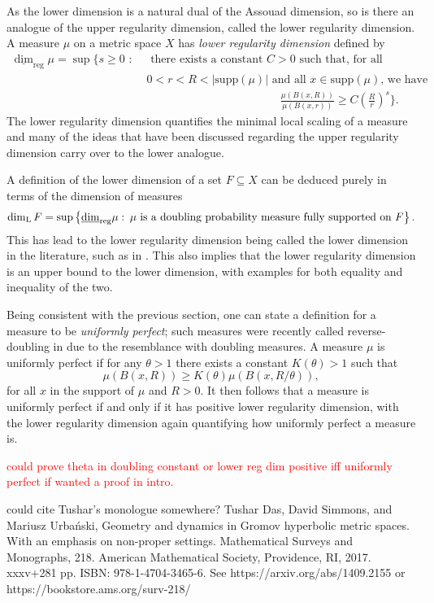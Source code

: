 As the lower dimension is a natural dual of the Assouad dimension, so is there an analogue of the upper regularity dimension, called the lower regularity dimension. A measure $\mu$ on a metric space $X$ has \textit{lower regularity dimension} defined by 
\begin{align*} 
\underline{\dim}_{\text{reg}} \mu = \sup \Bigg\{ s \geq 0 \, \,  : \,  &\,\text{ there exists a  constant }C  > 0\text{  such that, for all }  \\ & \, 0< r< R < \lvert \text{supp}(\mu)    \rvert \text{  and all $x \in \text{supp} (\mu)$, we have }  \\  & \hspace{5cm} \frac{\mu(B(x,R))}{\mu(B(x,r))} \geq C\left(\frac{R}{r}\right)^{s} \Bigg\}.
\end{align*}
The lower regularity dimension quantifies the minimal local scaling of a measure and many of the ideas that have been discussed regarding the upper regularity dimension carry over to the lower analogue. 

A definition of the lower dimension of a set $F\subseteq X$ can be deduced purely in terms of the dimension of measures
\begin{equation}
    \dim_{\text{L}} F = \sup \left\{ \underline{\dim}_{\textup{reg}} \mu \,  \colon \, \mu \text{ is a doubling probability measure fully supported on } F\right\}.
\end{equation}
This has lead to the lower regularity dimension being called the lower dimension in the literature, such as in \cite{}. This also implies that the lower regularity dimension is an upper bound to the lower dimension, with examples for both equality and inequality of the two.

Being consistent with the previous section, one can state a definition for a measure to be \textit{uniformly perfect}; such measures were recently called reverse-doubling in \cite{} due to the resemblance with doubling measures. A measure $\mu$ is uniformly perfect if for any $\theta > 1$ there exists a constant $K(\theta) > 1$ such that 
\[
\mu(B(x,R)) \ge K(\theta) \mu(B(x,R/\theta)),
\]
for all $x$ in the support of $\mu$ and $R > 0$. It then follows that a measure is uniformly perfect if and only if it has positive lower regularity dimension, with the lower regularity dimension again quantifying how uniformly perfect a measure is.


\textcolor{red}{could prove theta in doubling constant or lower reg dim positive iff uniformly perfect if wanted a proof in intro.}




could cite Tushar's monologue somewhere? Tushar Das, David Simmons, and Mariusz Urbański, Geometry and dynamics in Gromov hyperbolic metric spaces. With an emphasis on non-proper settings. Mathematical Surveys and Monographs, 218. American Mathematical Society, Providence, RI, 2017. xxxv+281 pp. ISBN: 978-1-4704-3465-6. See https://arxiv.org/abs/1409.2155 or https://bookstore.ams.org/surv-218/